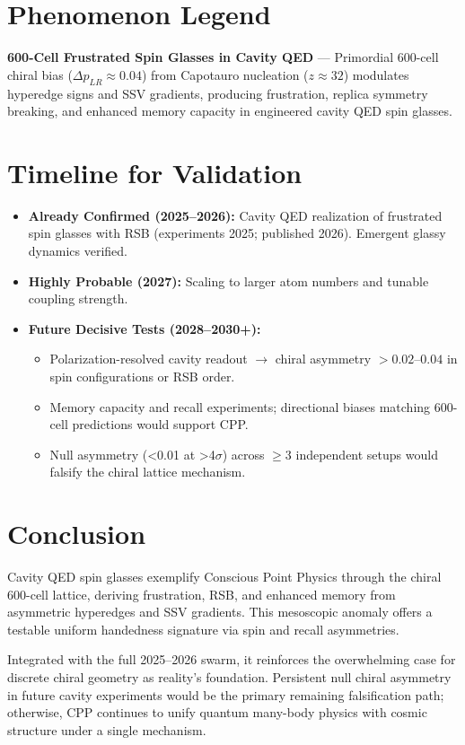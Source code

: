 \documentclass[11pt]{article}
\begin{document}
\section{Phenomenon Legend}
\textbf{600-Cell Frustrated Spin Glasses in Cavity QED} — Primordial 600-cell chiral bias ($\Delta p_{LR} \approx 0.04$) from Capotauro nucleation ($z \approx 32$) modulates hyperedge signs and SSV gradients, producing frustration, replica symmetry breaking, and enhanced memory capacity in engineered cavity QED spin glasses.

\section{Timeline for Validation}
\begin{itemize}
    \item \textbf{Already Confirmed (2025--2026):} Cavity QED realization of frustrated spin glasses with RSB (experiments 2025; published 2026). Emergent glassy dynamics verified.
    \item \textbf{Highly Probable (2027):} Scaling to larger atom numbers and tunable coupling strength.
    \item \textbf{Future Decisive Tests (2028--2030+):}
    \begin{itemize}
        \item Polarization-resolved cavity readout $\to$ chiral asymmetry $>0.02$--$0.04$ in spin configurations or RSB order.
        \item Memory capacity and recall experiments; directional biases matching 600-cell predictions would support CPP.
        \item Null asymmetry (<0.01 at >4$\sigma$) across $\geq 3$ independent setups would falsify the chiral lattice mechanism.
    \end{itemize}
\end{itemize}

\section{Conclusion}
Cavity QED spin glasses exemplify Conscious Point Physics through the chiral 600-cell lattice, deriving frustration, RSB, and enhanced memory from asymmetric hyperedges and SSV gradients. This mesoscopic anomaly offers a testable uniform handedness signature via spin and recall asymmetries.  

Integrated with the full 2025--2026 swarm, it reinforces the overwhelming case for discrete chiral geometry as reality's foundation. Persistent null chiral asymmetry in future cavity experiments would be the primary remaining falsification path; otherwise, CPP continues to unify quantum many-body physics with cosmic structure under a single mechanism.
\end{document}
